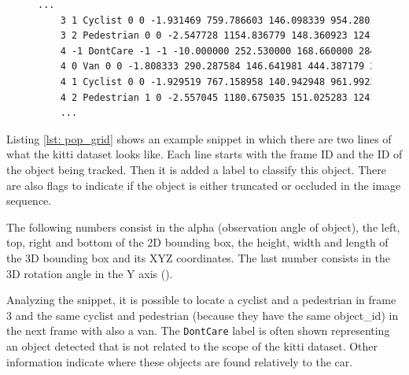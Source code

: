\begin{figure}
\begin{center}
	\begin{lstlisting}[caption={KITTI dataset file snippet presenting frame\_id, object\_id, label, truncated and occluded flags, alpha, left top and right bottom coordinates, height, width and length, 3D coordinates (x,y,z) and rotation}, language=xml, label={lst: pop_grid}]
	...
	3 1 Cyclist 0 0 -1.931469 759.786603 146.098339 954.280160 374.000000 1.739063 0.824591 1.785241 1.821119 1.569936 5.783265 -1.642450
	3 2 Pedestrian 0 0 -2.547728 1154.836779 148.360923 1241.000000 321.627088 1.714062 0.767881 0.972283 6.463579 1.474131 7.560739 -1.860031
	4 -1 DontCare -1 -1 -10.000000 252.530000 168.660000 284.460000 202.850000 -1000.000000 -1000.000000 -1000.000000 -10.000000 -1.000000 -1.000000 -1.000000
	4 0 Van 0 0 -1.808333 290.287584 146.641981 444.387179 269.473545 2.000000 1.823255 4.433886 -4.934786 1.601945 14.098646 -2.139796
	4 1 Cyclist 0 0 -1.929519 767.158958 140.942948 961.992360 374.000000 1.739063 0.824591 1.785241 1.881359 1.534695 5.785600 -1.631447
	4 2 Pedestrian 1 0 -2.557045 1180.675035 151.025283 1241.000000 325.015204 1.714062 0.767881 0.972283 6.516488 1.497786 7.267796 -1.846627
	...	\end{lstlisting}
\end{center}
\end{figure}

Listing \ref{lst: pop_grid} shows an example snippet in which there are two lines of what the \gls{kitti} dataset looks like. Each line starts with the frame ID and the ID of the object being tracked. Then it is added a label to classify this object. There are also flags to indicate if the object is either truncated or occluded in the image sequence. 

The following numbers consist in the alpha (observation angle of object), the left, top, right and bottom of the 2D bounding box, the height, width and length of the 3D bounding box and its XYZ coordinates. The last number consists in the 3D rotation angle in the Y axis (\cite{Team}).

Analyzing the snippet, it is possible to locate a cyclist and a pedestrian in frame 3 and the same cyclist and pedestrian (because they have the same object\_id) in the next frame with also a van. The \texttt{DontCare} label is often shown representing an object detected that is not related to the scope of the \gls{kitti} dataset. Other information indicate where these objects are found relatively to the car.

